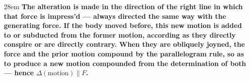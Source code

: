 \documentclass[border=4pt]{standalone}
\begin{document}
\begin{varwidth}{28em}
\large\bfseries
The alteration is made in the direction of the right line in which that force is impress'd --- always directed the same way with the generating force. If the body moved before, this new motion is added to or subducted from the former motion, according as they directly conspire or are directly contrary. When they are obliquely joyned, the force and the prior motion compound by the parallelogram rule, so as to produce a new motion compounded from the determination of both --- hence $\Delta(\text{motion}) \parallel F$.
\end{varwidth}
\end{document}
